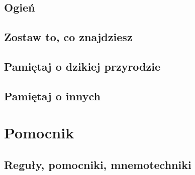 \documentclass[11pt,fleqn]{book} %
\begin{document}
\chapter{Ogień}
\label{rule4-fire}


\chapter{Zostaw to, co znajdziesz}
\label{rule5-leave}


\chapter{Pamiętaj o dzikiej przyrodzie}
\label{rule6-wildlife}


\chapter{Pamiętaj o innych}
\label{rule7-others}


\part{Pomocnik}



\chapter{Reguły, pomocniki, mnemotechniki}
\end{document}
